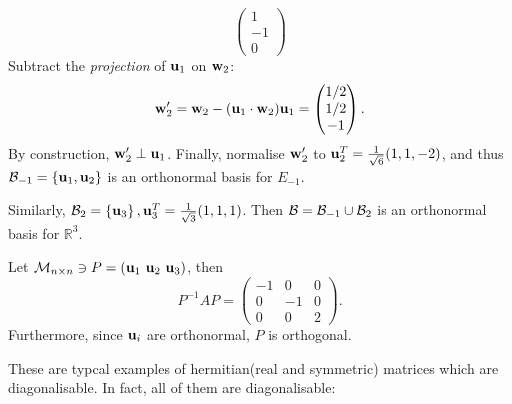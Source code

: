 \documentclass[10pt]{article}
\begin{document}
\begin{example}
\begin{enumerate}[(i)]
\[\begin{pmatrix}
                    1\\-1\\0
                \end{pmatrix}
            \]
            Subtract the \textit{projection} of ${\bf u}_1$ on ${\bf w}_2$:
            \[
                {\bf w}_2'={\bf w}_2-({\bf u}_1 \cdot {\bf w}_2){\bf u}_1=\begin{pmatrix}
                    1/2\\1/2\\-1
                \end{pmatrix}.
            \]
            By construction, $ {\bf w}_2' \perp {\bf u}_1 $. Finally, normalise $ {\bf w}_2' $ to $ {\bf u}_2^T=\frac{1}{\sqrt{6}}(1,1,-2) $, and thus $ {\mathcal{B}}_{-1}=\left\{ {\bf u}_1,{\bf u}_2 \right\} $ is an orthonormal basis for $ E_{-1} $.

            Similarly, $ {\mathcal{B}}_2=\left\{ {\bf u}_3 \right\} , {\bf u}_3^T=\frac{1}{\sqrt{3}}(1,1,1)$. Then $ {\mathcal{B}}={\mathcal{B}}_{-1}\cup {\mathcal{B}}_2 $ is an orthonormal basis for $ \mathbb{R}^{3} $.

            Let $ \mcM_{n\times n}\ni P=(\bfu_1\ \bfu_2\ \bfu_3) $, then 
            \[
                P^{-1}AP=\begin{pmatrix}
                    -1&0&0\\
                    0&-1&0\\
                    0&0&2
                \end{pmatrix}.
            \]
            Furthermore, since $ {\bf u}_i $ are orthonormal, $ P $ is orthogonal.
        \end{enumerate}
    \end{example}
    These are typcal examples of hermitian(real and symmetric) matrices which are diagonalisable. In fact, all of them are diagonalisable:
\end{document}

